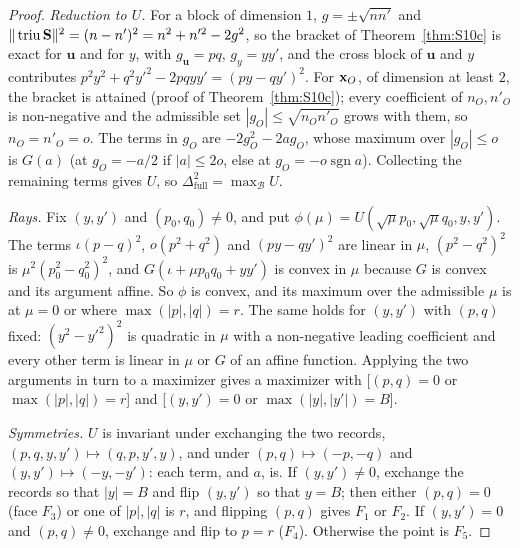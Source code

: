 \begin{proof}
\emph{Reduction to $U$.} For a block of dimension $1$, $g=\pm\sqrt{nn'}$ and $\|\operatorname{triu}\mathbf{S}\|^2=(n-n')^2=n^2+n'^2-2g^2$, so the bracket of Theorem~\ref{thm:S10c} is exact for $\mathbf u$ and for $y$, with $g_{\mathbf u}=pq$, $g_y=yy'$, and the cross block of $\mathbf u$ and $y$ contributes $p^2y^2+q^2y'^2-2pqyy'=(py-qy')^2$. For $\mathbf{x}_O$, of dimension at least $2$, the bracket is attained (proof of Theorem~\ref{thm:S10c}); every coefficient of $n_O,n'_O$ is non-negative and the admissible set $|g_O|\le\sqrt{n_On'_O}$ grows with them, so $n_O=n'_O=o$. The terms in $g_O$ are $-2g_O^2-2ag_O$, whose maximum over $|g_O|\le o$ is $G(a)$ (at $g_O=-a/2$ if $|a|\le2o$, else at $g_O=-o\operatorname{sgn}a$). Collecting the remaining terms gives $U$, so $\Delta^2_{\mathrm{full}}=\max_{\mathcal B}U$.

\emph{Rays.} Fix $(y,y')$ and $(p_0,q_0)\ne0$, and put $\phi(\mu)=U(\sqrt\mu p_0,\sqrt\mu q_0,y,y')$. The terms $\iota(p-q)^2$, $o(p^2+q^2)$ and $(py-qy')^2$ are linear in $\mu$, $(p^2-q^2)^2$ is $\mu^2(p_0^2-q_0^2)^2$, and $G(\iota+\mu p_0q_0+yy')$ is convex in $\mu$ because $G$ is convex and its argument affine. So $\phi$ is convex, and its maximum over the admissible $\mu$ is at $\mu=0$ or where $\max(|p|,|q|)=r$. The same holds for $(y,y')$ with $(p,q)$ fixed: $(y^2-y'^2)^2$ is quadratic in $\mu$ with a non-negative leading coefficient and every other term is linear in $\mu$ or $G$ of an affine function. Applying the two arguments in turn to a maximizer gives a maximizer with [$(p,q)=0$ or $\max(|p|,|q|)=r$] and [$(y,y')=0$ or $\max(|y|,|y'|)=B$].

\emph{Symmetries.} $U$ is invariant under exchanging the two records, $(p,q,y,y')\mapsto(q,p,y',y)$, and under $(p,q)\mapsto(-p,-q)$ and $(y,y')\mapsto(-y,-y')$: each term, and $a$, is. If $(y,y')\ne0$, exchange the records so that $|y|=B$ and flip $(y,y')$ so that $y=B$; then either $(p,q)=0$ (face $F_3$) or one of $|p|,|q|$ is $r$, and flipping $(p,q)$ gives $F_1$ or $F_2$. If $(y,y')=0$ and $(p,q)\ne0$, exchange and flip to $p=r$ ($F_4$). Otherwise the point is $F_5$.


\end{proof}
